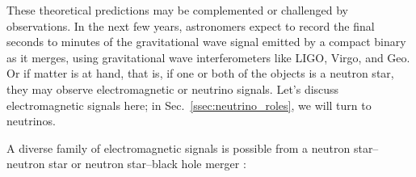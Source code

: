 These theoretical predictions may be complemented or challenged by observations.
In the next few years, astronomers expect to record the final seconds to minutes
of the gravitational wave signal emitted by a compact binary
as it merges, using gravitational wave interferometers like LIGO, Virgo, and Geo.
Or if matter is at hand, that is, if one or both of the objects is a neutron
star, they may observe electromagnetic or neutrino signals. Let's discuss
electromagnetic signals here; in Sec.~\ref{ssec:neutrino_roles}, we will
turn to neutrinos.

A diverse family of electromagnetic signals is possible from a neutron
star--neutron star \nsns or neutron star--black hole merger \nsbh:
